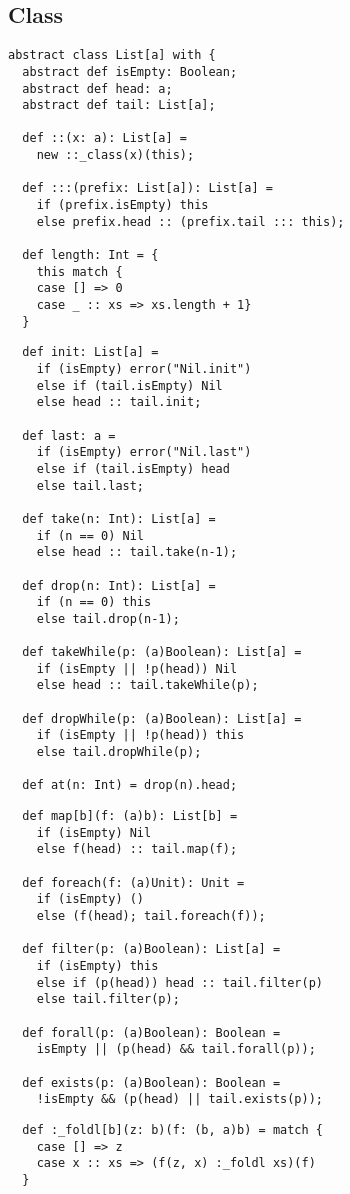 \documentclass[11pt]{report}
\begin{document}
\begin{itemize}
\subsection{Class }\label{cls-list}

\begin{verbatim}
abstract class List[a] with {
  abstract def isEmpty: Boolean;
  abstract def head: a;
  abstract def tail: List[a];

  def ::(x: a): List[a] =
    new ::_class(x)(this);

  def :::(prefix: List[a]): List[a] =
    if (prefix.isEmpty) this
    else prefix.head :: (prefix.tail ::: this);

  def length: Int = {
    this match {
	case [] => 0
    case _ :: xs => xs.length + 1}
  }
\end{verbatim}
\begin{verbatim}
  def init: List[a] =
    if (isEmpty) error("Nil.init")
    else if (tail.isEmpty) Nil
    else head :: tail.init;

  def last: a =
    if (isEmpty) error("Nil.last")
    else if (tail.isEmpty) head
    else tail.last;

  def take(n: Int): List[a] =
    if (n == 0) Nil
    else head :: tail.take(n-1);

  def drop(n: Int): List[a] =
    if (n == 0) this
    else tail.drop(n-1);

  def takeWhile(p: (a)Boolean): List[a] =
    if (isEmpty || !p(head)) Nil
    else head :: tail.takeWhile(p);

  def dropWhile(p: (a)Boolean): List[a] =
    if (isEmpty || !p(head)) this
    else tail.dropWhile(p);

  def at(n: Int) = drop(n).head;
\end{verbatim}
\begin{verbatim}
  def map[b](f: (a)b): List[b] =
    if (isEmpty) Nil
    else f(head) :: tail.map(f);

  def foreach(f: (a)Unit): Unit =
    if (isEmpty) ()
    else (f(head); tail.foreach(f));

  def filter(p: (a)Boolean): List[a] =
    if (isEmpty) this
    else if (p(head)) head :: tail.filter(p)
    else tail.filter(p);

  def forall(p: (a)Boolean): Boolean =
    isEmpty || (p(head) && tail.forall(p));

  def exists(p: (a)Boolean): Boolean =
    !isEmpty && (p(head) || tail.exists(p));
\end{verbatim}
\begin{verbatim}
  def :_foldl[b](z: b)(f: (b, a)b) = match {
    case [] => z
    case x :: xs => (f(z, x) :_foldl xs)(f)
  }


\end{verbatim}
\end{itemize}
\end{document}
